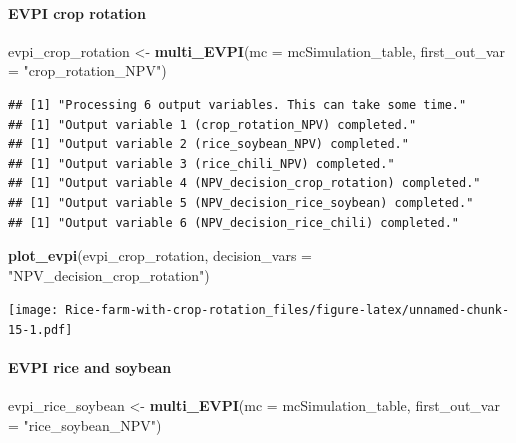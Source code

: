\documentclass[
]{article}
\newenvironment{Shaded}{\begin{snugshade}}{\end{snugshade}}
\newcommand{\AttributeTok}[1]{\textcolor[rgb]{0.13,0.29,0.53}{#1}}
\newcommand{\FunctionTok}[1]{\textcolor[rgb]{0.13,0.29,0.53}{\textbf{#1}}}
\newcommand{\NormalTok}[1]{#1}
\newcommand{\OtherTok}[1]{\textcolor[rgb]{0.56,0.35,0.01}{#1}}
\newcommand{\StringTok}[1]{\textcolor[rgb]{0.31,0.60,0.02}{#1}}
\begin{document}
\hypertarget{evpi-crop-rotation}{%
\paragraph{EVPI crop rotation}\label{evpi-crop-rotation}}

\begin{Shaded}
\begin{Highlighting}[]
\NormalTok{evpi\_crop\_rotation }\OtherTok{\textless{}{-}} \FunctionTok{multi\_EVPI}\NormalTok{(}\AttributeTok{mc =}\NormalTok{ mcSimulation\_table, }\AttributeTok{first\_out\_var =} \StringTok{"crop\_rotation\_NPV"}\NormalTok{)}
\end{Highlighting}
\end{Shaded}

\begin{verbatim}
## [1] "Processing 6 output variables. This can take some time."
## [1] "Output variable 1 (crop_rotation_NPV) completed."
## [1] "Output variable 2 (rice_soybean_NPV) completed."
## [1] "Output variable 3 (rice_chili_NPV) completed."
## [1] "Output variable 4 (NPV_decision_crop_rotation) completed."
## [1] "Output variable 5 (NPV_decision_rice_soybean) completed."
## [1] "Output variable 6 (NPV_decision_rice_chili) completed."
\end{verbatim}

\begin{Shaded}
\begin{Highlighting}[]
\FunctionTok{plot\_evpi}\NormalTok{(evpi\_crop\_rotation, }\AttributeTok{decision\_vars =} \StringTok{"NPV\_decision\_crop\_rotation"}\NormalTok{)}
\end{Highlighting}
\end{Shaded}

\texttt{[image: Rice-farm-with-crop-rotation\_files/figure-latex/unnamed-chunk-15-1.pdf]}

\hypertarget{evpi-rice-and-soybean}{%
\paragraph{EVPI rice and soybean}\label{evpi-rice-and-soybean}}

\begin{Shaded}
\begin{Highlighting}[]
\NormalTok{evpi\_rice\_soybean }\OtherTok{\textless{}{-}} \FunctionTok{multi\_EVPI}\NormalTok{(}\AttributeTok{mc =}\NormalTok{ mcSimulation\_table, }\AttributeTok{first\_out\_var =} \StringTok{"rice\_soybean\_NPV"}\NormalTok{)}
\end{Highlighting}
\end{Shaded}
\end{document}
